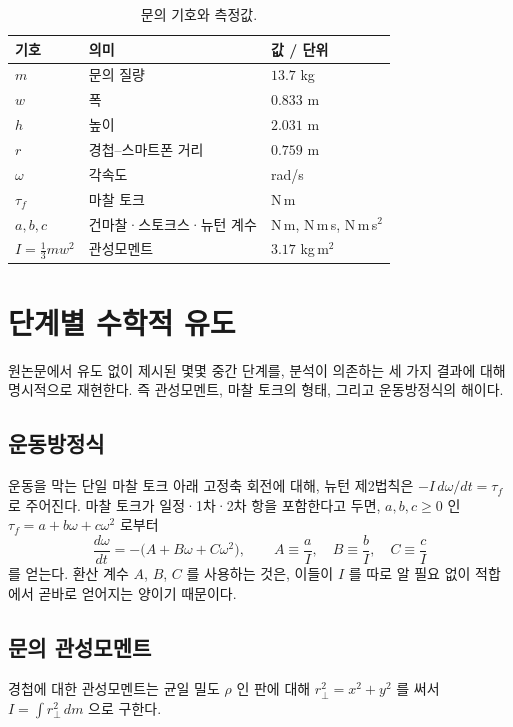 \documentclass[11pt,letterpaper]{article}
\begin{document}
\begin{table}[h!]
\centering
\caption{문의 기호와 측정값.}
\label{tab:variables}
\begin{tabular}{lll}
\toprule
\textbf{기호} & \textbf{의미} & \textbf{값 / 단위} \\
\midrule
$m$ & 문의 질량 & $13.7$ kg \\
$w$ & 폭 & $0.833$ m \\
$h$ & 높이 & $2.031$ m \\
$r$ & 경첩--스마트폰 거리 & $0.759$ m \\
$\omega$ & 각속도 & rad/s \\
$\tau_f$ & 마찰 토크 & N\,m \\
$a,b,c$ & 건마찰·스토크스·뉴턴 계수 & N\,m, N\,m\,s, N\,m\,s$^2$ \\
$I=\tfrac13 mw^2$ & 관성모멘트 & $3.17$ kg\,m$^2$ \\
\bottomrule
\end{tabular}
\end{table}

\section{단계별 수학적 유도}
원논문에서 유도 없이 제시된 몇몇 중간 단계를, 분석이 의존하는 세 가지 결과에 대해
명시적으로 재현한다. 즉 관성모멘트, 마찰 토크의 형태, 그리고 운동방정식의 해이다.

\subsection{운동방정식}
운동을 막는 단일 마찰 토크 아래 고정축 회전에 대해, 뉴턴 제2법칙은 $-I\,d\omega/dt=\tau_f$
로 주어진다. 마찰 토크가 일정·1차·2차 항을 포함한다고 두면, $a,b,c\ge 0$ 인
$\tau_f=a+b\omega+c\omega^2$ 로부터
\begin{equation}\label{eq:ode}
\frac{d\omega}{dt}=-\bigl(A+B\omega+C\omega^2\bigr),
\qquad A\equiv\frac{a}{I},\quad B\equiv\frac{b}{I},\quad C\equiv\frac{c}{I}
\end{equation}
를 얻는다. 환산 계수 $A$, $B$, $C$ 를 사용하는 것은, 이들이 $I$ 를 따로 알 필요 없이
적합에서 곧바로 얻어지는 양이기 때문이다.

\subsection{문의 관성모멘트}
경첩에 대한 관성모멘트는 균일 밀도 $\rho$ 인 판에 대해 $r_\perp^2=x^2+y^2$ 를 써서
$I=\int r_\perp^2\,dm$ 으로 구한다.
\end{document}
